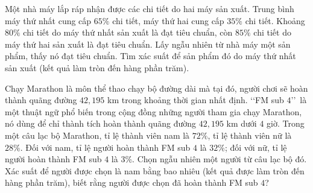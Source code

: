 \begin{bt}%
	Một nhà máy lắp ráp nhận được các chi tiết do hai máy sản xuất. Trung bình máy thứ nhất cung cấp $65\%$ chi tiết, máy thứ hai cung cấp $35\%$ chi tiết. Khoảng $80\%$  chi tiết do máy thứ nhất sản xuất là đạt tiêu chuẩn, còn $85\%$ chi tiết do máy thứ hai sản xuất là đạt tiêu chuẩn. Lấy ngẫu nhiên từ nhà máy một sản phẩm, thấy nó đạt tiêu chuẩn. Tìm xác suất để sản phẩm đó do máy thứ nhất sản xuất (kết quả làm tròn đến hàng phần trăm).
\end{bt}

\begin{bt}%
	Chạy Marathon là môn thể thao chạy bộ đường dài mà tại đó, người chơi sẽ hoàn thành  quãng đường $42{,}195$ km trong khoảng thời gian nhất định.
	\lq\lq FM sub $4$\rq\rq\ là một thuật ngữ phổ biến trong cộng đồng những người tham gia chạy Marathon, nó dùng để chỉ thành tích hoàn thành quãng đường $42{,}195$ km dưới $4$ giờ. Trong một câu lạc bộ Marathon, tỉ lệ thành viên nam là $72\%$, tỉ lệ thành viên nữ là $28\%$. Đối với nam, tỉ lệ người hoàn thành FM sub $4$ là $32\%$; đối với nữ, tỉ lệ người hoàn thành FM sub $4$ là $3\%$. Chọn ngẫu nhiên một người từ câu lạc bộ đó. Xác suất để người được chọn là nam bằng  bao nhiêu (kết quả được làm tròn đến hàng phần trăm), biết rằng người được chọn đã hoàn thành FM sub $4$? 
\end{bt}

